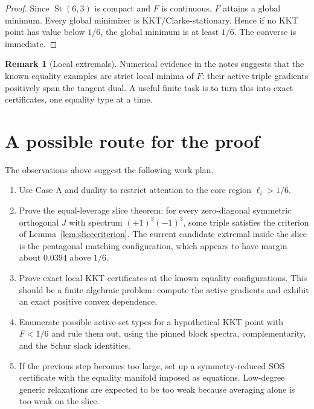 \documentclass[11pt]{article}
\numberwithin{equation}{section}
\theoremstyle{definition}
\newtheorem{remark}[theorem]{Remark}
\newcommand{\St}{\operatorname{St}}
\begin{document}
\begin{proof}
Since $\St(6,3)$ is compact and $F$ is continuous, $F$ attains a global
minimum.  Every global minimizer is KKT/Clarke-stationary.  Hence if no KKT
point has value below $1/6$, the global minimum is at least $1/6$.  The converse
is immediate.
\end{proof}

\begin{remark}[Local extremals]
Numerical evidence in the notes suggests that the known equality examples are
strict local minima of $F$: their active triple gradients positively span the
tangent dual.  A useful finite task is to turn this into exact certificates,
one equality type at a time.
\end{remark}

\section{A possible route for the proof}

The observations above suggest the following work plan.

\begin{enumerate}[label=\textbf{Step \arabic*.},leftmargin=*]
\item Use Case A and duality to restrict attention to the core region
$\ell_i>1/6$.

\item Prove the equal-leverage slice theorem:
for every zero-diagonal symmetric orthogonal $J$ with spectrum $(+1)^3(-1)^3$,
some triple satisfies the criterion of Lemma~\ref{lem:slicecriterion}.
The current candidate extremal inside the slice is the pentagonal matching
configuration, which appears to have margin about $0.0394$ above $1/6$.

\item Prove exact local KKT certificates at the known equality configurations.
This should be a finite algebraic problem: compute the active gradients and
exhibit an exact positive convex dependence.

\item Enumerate possible active-set types for a hypothetical KKT point with
$F<1/6$ and rule them out, using the pinned block spectra, complementarity, and
the Schur slack identities.

\item If the previous step becomes too large, set up a symmetry-reduced SOS
certificate with the equality manifold imposed as equations.  Low-degree
generic relaxations are expected to be too weak because averaging alone is too
weak on the slice.
\end{enumerate}
\end{document}
